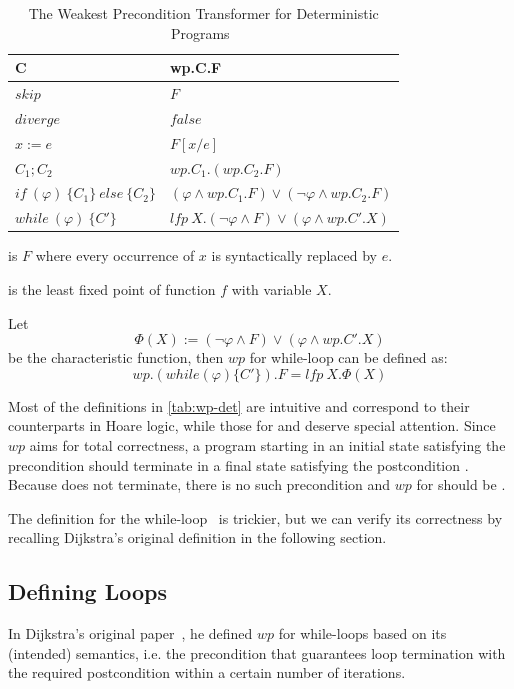 \begin{table}[ht!]\centering
    \begin{tabular}{ll}
    \hline\hline
      \textbf{C}&\textbf{wp.C.F}    \\ \hline
      $skip$&   $F$   \\
      $diverge$&  $false$\\
      $x:= e $&  $F[x/e]$\\
      $C_1;C_2$&  $wp.C_1.(wp.C_2.F)$\\
      $if\ (\varphi)\ \{C_1\}\ else\ \{C_2\} $&  $(\varphi\wedge wp.C_1.F)\vee(\neg\varphi\wedge wp.C_2.F)$\\
      $while\ (\varphi)\ \{C'\}$&  $lfp\ X.(\neg\varphi\wedge F)\vee(\varphi\wedge wp.C'.X)$\\
    \hline\hline
    \end{tabular}
    \caption{The Weakest Precondition Transformer for Deterministic Programs~\cite{kaminski19}}
    \label{tab:wp-det}
\end{table}

 is $F$ where every occurrence of $x$ is syntactically replaced by $e$. 

 is the least fixed point of function $f$ with variable $X$. 

Let {$$\Phi(X):=(\neg\varphi\wedge F)\vee(\varphi\wedge wp.C'.X)$$} be the characteristic function, then $wp$ for while-loop can be defined as: 
{$$wp.(while(\varphi)\{C'\}).F = lfp\ X. \Phi(X)$$}

Most of the definitions in \autoref{tab:wp-det} are intuitive and correspond to their counterparts in Hoare logic, while those for  and  deserve special attention. 
Since $wp$ aims for total correctness, a program starting in an initial state satisfying the precondition  should terminate in a final state satisfying the postcondition . 
Because  does not terminate, there is no such precondition and $wp$ for  should be . 

The definition for the while-loop~\cite{kaminski19} is trickier, but we can verify its correctness by recalling Dijkstra's original definition in the following section. 


\subsection{Defining Loops}
In Dijkstra's original paper~\cite{dijkstra75}, he defined $wp$ for while-loops based on its (intended) semantics, i.e. the precondition that guarantees loop termination with the required postcondition within a certain number of iterations. 

